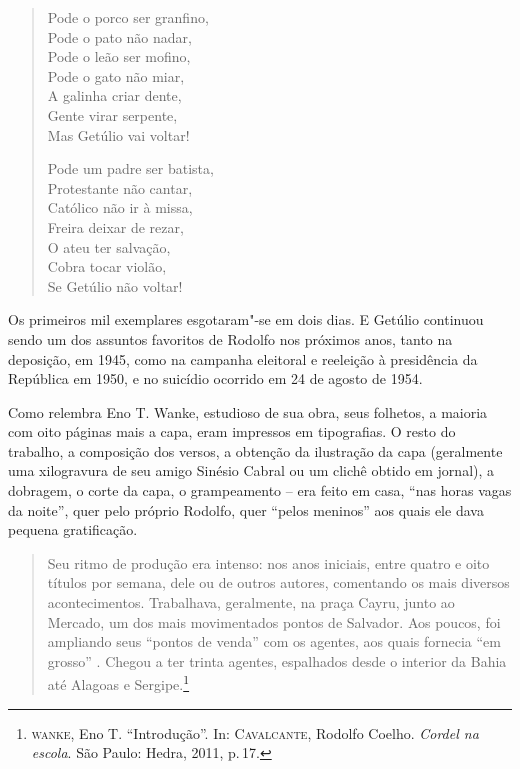 \begin{verse}
Pode o porco ser granfino, \\
Pode o pato não nadar, \\
Pode o leão ser mofino, \\
Pode o gato não miar, \\
A galinha criar dente, \\
Gente virar serpente, \\
Mas Getúlio vai voltar!

Pode um padre ser batista, \\
Protestante não cantar, \\
Católico não ir à missa, \\
Freira deixar de rezar, \\
O ateu ter salvação, \\
Cobra tocar violão, \\
Se Getúlio não voltar!
\end{verse}

Os primeiros mil exemplares esgotaram"-se em dois dias.
E Getúlio continuou sendo um dos assuntos
favoritos de Rodolfo nos próximos anos, tanto na deposição, em 1945,
como na campanha eleitoral e reeleição à presidência da República em
1950, e no suicídio ocorrido em 24 de agosto de 1954. 

Como relembra Eno T. Wanke, estudioso de sua obra, seus folhetos, a maioria com oito páginas mais a capa, eram impressos
em tipografias. O resto do trabalho, a composição dos versos, a
obtenção da ilustração da capa (geralmente uma xilogravura de seu amigo
Sinésio Cabral ou um clichê obtido em jornal), a dobragem, o corte da
capa, o grampeamento -- era feito em casa, ``nas horas
vagas da noite'', quer pelo próprio Rodolfo, quer
``pelos meninos'' aos quais ele dava pequena
gratificação. 

\begin{quote}
Seu ritmo de produção era intenso: nos anos iniciais, entre quatro e
oito títulos por semana, dele ou de outros autores, comentando os mais
diversos acontecimentos. Trabalhava, geralmente, na praça Cayru, junto
ao Mercado, um dos mais movimentados pontos de Salvador. Aos poucos,
foi ampliando seus ``pontos de venda'' com os
agentes, aos quais fornecia ``em grosso'' .
Chegou a ter trinta agentes, espalhados desde o interior da Bahia até
Alagoas e Sergipe.\footnote{\textsc{wanke}, Eno T. ``Introdução''. In: \textsc{Cavalcante}, Rodolfo Coelho. \textit{Cordel na escola}. São Paulo: Hedra, 2011, p.\,17.}
\end{quote}

